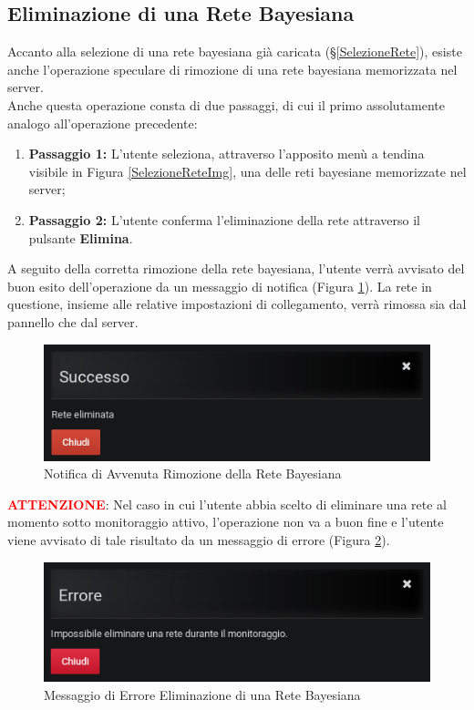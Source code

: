 \subsection{Eliminazione di una Rete Bayesiana}\label{EliminazioneRete}

Accanto alla selezione di una rete bayesiana già caricata (§\ref{SelezioneRete}), esiste anche l'operazione speculare di rimozione di una rete bayesiana memorizzata nel server.\\
Anche questa operazione consta di due passaggi, di cui il primo assolutamente analogo all'operazione precedente:
\begin{enumerate}
	\item \textbf{Passaggio 1:} L'utente seleziona, attraverso l'apposito menù a tendina visibile in Figura \ref{SelezioneReteImg}, una delle reti bayesiane memorizzate nel server;
	\item \textbf{Passaggio 2:} L'utente conferma l'eliminazione della rete attraverso il pulsante \textbf{Elimina}.
\end{enumerate}

A seguito della corretta rimozione della rete bayesiana, l'utente verrà avvisato del buon esito dell'operazione da un messaggio di notifica (Figura \ref{NotificaRimozioneRete}). La rete in questione, insieme alle relative impostazioni di collegamento, verrà rimossa sia dal pannello che dal server.

\begin{figure}[H]
	\begin{center}
		\includegraphics[scale=0.6]{./images/NotificaRimozioneRete.png}
		 \caption{Notifica di Avvenuta Rimozione della Rete Bayesiana}	
		 \label{NotificaRimozioneRete}
	\end{center}
\end{figure}

\textbf{\textcolor{red}{ATTENZIONE}}: Nel caso in cui l'utente abbia scelto di eliminare una rete al momento sotto monitoraggio attivo, l'operazione non va a buon fine e l'utente viene avvisato di tale risultato da un messaggio di errore (Figura \ref{ErroreDeleteNet}).

\begin{figure}[H]
	\begin{center}
		\includegraphics[scale=0.6]{./images/ErroreDeleteNet.png}
		 \caption{Messaggio di Errore Eliminazione di una Rete Bayesiana}	
		 \label{ErroreDeleteNet}
	\end{center}
\end{figure}
